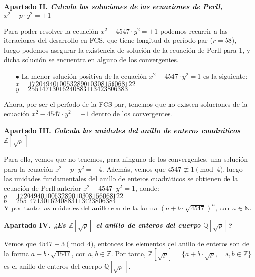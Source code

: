 \documentclass[fleqn]{article}
\def\Z{\mathds{Z}}
\def\N{\mathds{N}}
\def\Q{\mathds{Q}}
\begin{document}
    \newpage
    \textbf{Apartado II. \textit{Calcula las soluciones de las ecuaciones de Perll, $x^2 - p \cdot y^2 = \pm 1$}}

    Para poder resolver la ecuación $x^2 - 4547 \cdot y^2 = \pm 1$ podemos recurrir a las iteraciones del desarrollo en FCS, que tiene 
    longitud de período par ($r = 58$), luego podemos asegurar la existencia de solución de la ecuación de Perll para 1, y dicha solución 
    se encuentra en alguno de los convergentes.

    \begin{enumerate}
        \item[$\bullet$] La menor solución positiva de la ecuación $x^2 - 4547 \cdot y^2 = 1$ es la siguiente: \\
                        $x = 1720494010053289010308156068122$ \\
                        $y = 25514713016240883113423806383$ 
    \end{enumerate}

    Ahora, por ser el período de la FCS par, tenemos que no existen soluciones de la ecuación $x^2 - 4547 \cdot y^2 = - 1$ 
    dentro de los convergentes.

    \newpage
    \textbf{Apartado III. \textit{Calcula las unidades del anillo de enteros cuadráticos $\Z[\sqrt{p}]$}}

    Para ello, vemos que no tenemos, para ninguno de los convergentes, una solución para la ecuación $x^2 - p \cdot y^2 = \pm 4$. 
    Además, vemos que $4547 \not\equiv 1 \pmod{4}$, luego las unidades fundamentales del anillo de enteros cuadráticos se obtienen 
    de la ecuación de Perll anterior $x^2 - 4547 \cdot y^2 = 1$, donde:\\
    $a = 1720494010053289010308156068122$ \\
    $b = 25514713016240883113423806383$ \\
        
    Y por tanto las unidades del anillo son de la forma $(a + b \cdot \sqrt{4547})^n$, con $n \in \N$.

    \newpage
    \textbf{Apartado IV. \textit{¿Es $\Z[\sqrt{p}]$ el anillo de enteros del cuerpo $\Q[\sqrt{p}]$?}}

    Vemos que $4547 \equiv 3 \pmod{4}$, entonces los elementos del anillo de enteros son de la forma $a + b \cdot \sqrt{4547}$, con $a,b \in \Z$.
    Por tanto, $\Z[\sqrt{p}] = \{a + b\cdot \sqrt{p}, \quad a,b \in \Z \}$ es el anillo de enteros del cuerpo $\Q[\sqrt{p}]$.
\end{document}
